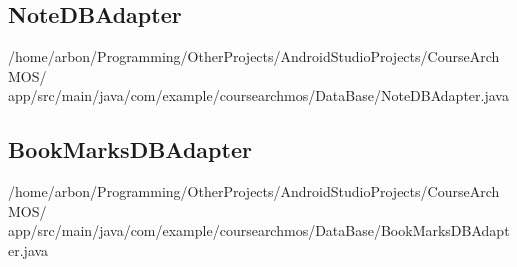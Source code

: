 \subsection{NoteDBAdapter}\label{lst:db:adapter:note}

{/home/arbon/Programming/OtherProjects/AndroidStudioProjects/CourseArchMOS/%
app/src/main/java/com/example/coursearchmos/DataBase/NoteDBAdapter.java}

\subsection{BookMarksDBAdapter}\label{lst:db:adapter:bookmark}

{/home/arbon/Programming/OtherProjects/AndroidStudioProjects/CourseArchMOS/%
app/src/main/java/com/example/coursearchmos/DataBase/BookMarksDBAdapter.java}
